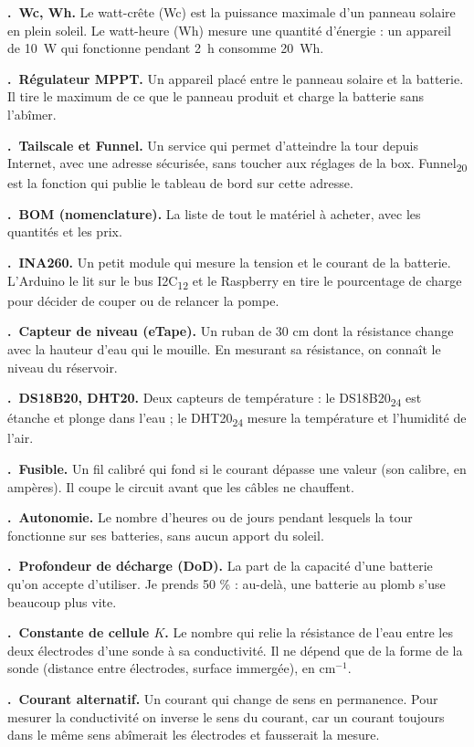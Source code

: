 \documentclass[11pt,a4paper]{article}
\newcounter{lex}
\newcommand{\terme}[2]{\par\medskip\noindent\stepcounter{lex}\textbf{\thelex.\ #1.} #2\par}
\newcommand{\ix}[1]{\textsubscript{#1}}
\begin{document}
\terme{Wc, Wh}{Le watt-crête (Wc) est la puissance maximale d'un panneau solaire en plein soleil. Le watt-heure (Wh) mesure une quantité d'énergie : un appareil de \qty{10}{W} qui fonctionne pendant \qty{2}{h} consomme \qty{20}{Wh}.}

\terme{Régulateur MPPT}{Un appareil placé entre le panneau solaire et la batterie. Il tire le maximum de ce que le panneau produit et charge la batterie sans l'abîmer.}

\terme{Tailscale et Funnel}{Un service qui permet d'atteindre la tour depuis Internet, avec une adresse sécurisée, sans toucher aux réglages de la box. Funnel\ix{20} est la fonction qui publie le tableau de bord sur cette adresse.}

\terme{BOM (nomenclature)}{La liste de tout le matériel à acheter, avec les quantités et les prix.}

\terme{INA260}{Un petit module qui mesure la tension et le courant de la batterie. L'Arduino le lit sur le bus I2C\ix{12} et le Raspberry en tire le pourcentage de charge pour décider de couper ou de relancer la pompe.}

\terme{Capteur de niveau (eTape)}{Un ruban de 30 cm dont la résistance change avec la hauteur d'eau qui le mouille. En mesurant sa résistance, on connaît le niveau du réservoir.}

\terme{DS18B20, DHT20}{Deux capteurs de température : le DS18B20\ix{24} est étanche et plonge dans l'eau ; le DHT20\ix{24} mesure la température et l'humidité de l'air.}

\terme{Fusible}{Un fil calibré qui fond si le courant dépasse une valeur (son calibre, en ampères). Il coupe le circuit avant que les câbles ne chauffent.}

\terme{Autonomie}{Le nombre d'heures ou de jours pendant lesquels la tour fonctionne sur ses batteries, sans aucun apport du soleil.}

\terme{Profondeur de décharge (DoD)}{La part de la capacité d'une batterie qu'on accepte d'utiliser. Je prends 50 \% : au-delà, une batterie au plomb s'use beaucoup plus vite.}

\terme{Constante de cellule $K$}{Le nombre qui relie la résistance de l'eau entre les deux électrodes d'une sonde à sa conductivité. Il ne dépend que de la forme de la sonde (distance entre électrodes, surface immergée), en cm$^{-1}$.}

\terme{Courant alternatif}{Un courant qui change de sens en permanence. Pour mesurer la conductivité on inverse le sens du courant, car un courant toujours dans le même sens abîmerait les électrodes et fausserait la mesure.}
\end{document}
